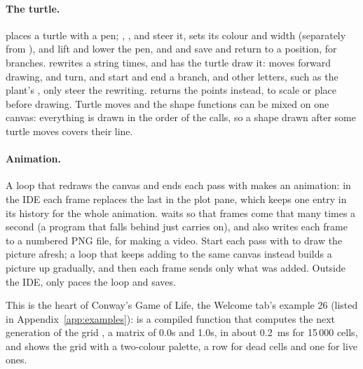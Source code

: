 \documentclass[11pt,a4paper,openany]{report}
\begin{document}
{{\paragraph{The turtle.}  places a turtle with a pen;
, ,  and  steer it,
 sets its colour and width (separately from
),  and  lift
and lower the pen, and  and  save and return to a
position, for branches.  rewrites a
string  times, and  has the
turtle draw it:  moves forward drawing, \code{+} and \code{-} turn,
\code{[} and \code{]} start and end a branch, and other letters, such as the
plant's , only steer the rewriting.  returns
the points instead, to scale or place before drawing. Turtle moves and
the shape functions can be mixed on one canvas: everything is drawn in
the order of the calls, so a shape drawn after some turtle moves covers
their line.

\paragraph{Animation.} A loop that redraws the canvas and ends each pass with
 makes an animation: in the IDE each frame replaces the
last in the plot pane, which keeps one entry in its history for the whole
animation.  waits so that frames come that many
times a second (a program that falls behind just carries on), and
 also writes each frame to a numbered PNG file,
for making a video. Start each pass with  to draw the
picture afresh; a loop that keeps adding to the same canvas instead builds a
picture up gradually, and then each frame sends only what was added. Outside
the IDE,  only paces the loop and saves.



This is the heart of Conway's Game of Life, the Welcome tab's example 26
(listed in Appendix~\ref{app:examples}):  is a compiled function
that computes the next generation of the grid , a matrix of 0.0s and
1.0s, in about 0.2~ms for 15\,000 cells, and  shows the
grid with a two-colour palette, a row \code{[r, g, b]} for dead cells and
one for live ones.

}}
\end{document}
